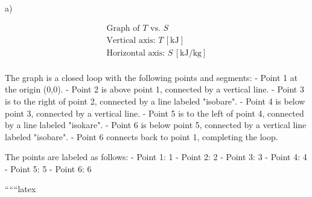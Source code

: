 a)

\[
\begin{array}{c}
\text{Graph of } T \text{ vs. } S \\
\text{Vertical axis: } T \, [\text{kJ}] \\
\text{Horizontal axis: } S \, [\text{kJ/kg}] \\
\end{array}
\]

The graph is a closed loop with the following points and segments:
- Point 1 at the origin (0,0).
- Point 2 is above point 1, connected by a vertical line.
- Point 3 is to the right of point 2, connected by a line labeled "isobare".
- Point 4 is below point 3, connected by a vertical line.
- Point 5 is to the left of point 4, connected by a line labeled "isokare".
- Point 6 is below point 5, connected by a vertical line labeled "isobare".
- Point 6 connects back to point 1, completing the loop.

The points are labeled as follows:
- Point 1: 1
- Point 2: 2
- Point 3: 3
- Point 4: 4
- Point 5: 5
- Point 6: 6

``````latex
